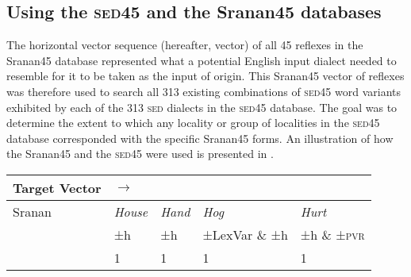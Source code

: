{{{{{{{{{\subsection{Using the \textsc{sed45} and the Sranan45 databases}\label{3.4.2}
The horizontal vector sequence (hereafter, vector) of all 45 reflexes in the  Sranan45 database represented what a potential English input dialect needed to resemble for it to be taken as the input of origin. This Sranan45 vector of reflexes was therefore used to search all 313 existing combinations of \textsc{sed45} word variants exhibited by each of the 313 \textsc{sed} dialects in the \textsc{sed45} database. The goal was to determine the extent to which any locality or group of localities in the \textsc{sed45} database corresponded with the specific Sranan45 forms. An illustration of how the Sranan45 and the \textsc{sed45} were used is presented in .
\clearpage

\begin{table}
\begin{tabularx}{.8\textwidth}{Xllll}
\lsptoprule 
Target Vector & \multicolumn{4}{l}{$\longrightarrow$}\\
\midrule 
Sranan & \emph{House} & \emph{Hand} & \emph{Hog} & \emph{Hurt} \\
& ±h  & ±h & ±LexVar \& ±h & ±h \& ±\textsc{pvr} \\
& \cellcolor{green!35}1 & \cellcolor{green!35}1 & \cellcolor{green!35}1 & \cellcolor{green!35}1 \\


\end{tabularx}
\end{table}}}}}}}}}}
